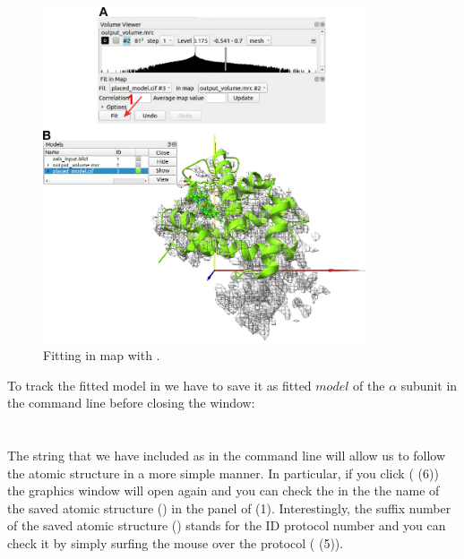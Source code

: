   \begin{figure}[H]
  \centering 
  \captionsetup{width=.7\linewidth} 
  \includegraphics[width=0.85\textwidth]{Images/Fig22}
  \caption{Fitting in map with \chimera.}
  \label{fig:chimera_fit_in_map}
  \end{figure}
  
  To track the \chimera fitted model in \scipion we have to save it as fitted $model$ of the  $\alpha$ subunit in the \chimera command line before closing the \chimera window:\\
  \\
  \\
  
  The string that we have included as  in the command line will allow us to follow the atomic structure in a more simple manner. In particular, if you click  ( (6)) the \chimera graphics window will open again and you can check the  in the the name of the saved atomic structure () in the  panel of  (1). Interestingly, the suffix number of the saved atomic structure () stands for the ID protocol number and you can check it by simply surfing the mouse over the protocol ( (5)).
  
